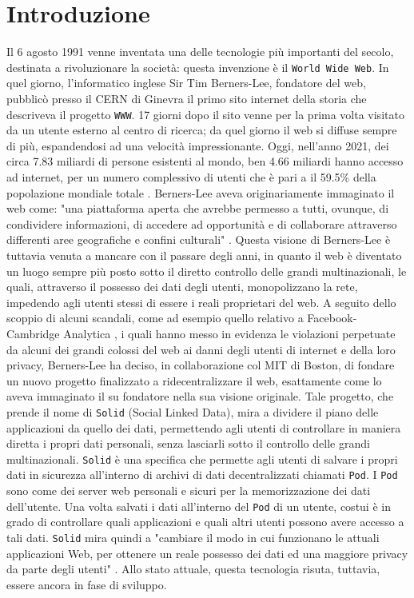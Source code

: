 \onehalfspacing

\chapter{Introduzione}

\medskip

Il 6 agosto 1991 venne inventata una delle tecnologie più importanti del secolo, destinata a rivoluzionare la società: questa invenzione è il {\tt World Wide Web}. In quel giorno, l'informatico inglese Sir Tim Berners-Lee, fondatore del web, pubblicò presso il CERN di Ginevra il primo sito internet della storia che descriveva il progetto {\tt WWW}. 17 giorni dopo il sito venne per la prima volta visitato da un utente esterno al centro di ricerca; da quel giorno il web si diffuse sempre di più, espandendosi ad una velocità impressionante. Oggi, nell'anno 2021, dei circa 7.83 miliardi di persone esistenti al mondo, ben 4.66 miliardi hanno accesso ad internet, per un numero complessivo di utenti che è pari a il 59.5\% della popolazione mondiale totale \cite{wearesocial}. Berners-Lee aveva originariamente immaginato il web come: "una piattaforma aperta che avrebbe permesso a tutti, ovunque, di condividere informazioni, di accedere ad opportunità e di collaborare attraverso differenti aree geografiche e confini culturali" \cite{worldwideweb}. Questa visione di Berners-Lee è tuttavia venuta a mancare con il passare degli anni, in quanto il web è diventato un luogo sempre più posto sotto il diretto controllo delle grandi multinazionali, le quali, attraverso il possesso dei dati degli utenti, monopolizzano la rete, impedendo agli utenti stessi di essere i reali proprietari del web. A seguito dello scoppio di alcuni scandali, come ad esempio quello relativo a Facebook-Cambridge Analytica \cite{facebook}, i quali hanno messo in evidenza le violazioni perpetuate da alcuni dei grandi colossi del web ai danni degli utenti di internet e della loro privacy, Berners-Lee ha deciso, in collaborazione col MIT di Boston, di fondare un nuovo progetto finalizzato a ridecentralizzare il web, esattamente come lo aveva immaginato il su fondatore nella sua visione originale. Tale progetto, che prende il nome di {\tt Solid} (Social Linked Data), mira a dividere il piano delle applicazioni da quello dei dati, permettendo agli utenti di controllare in maniera diretta i propri dati personali, senza lasciarli sotto il controllo delle grandi multinazionali. {\tt Solid} è una specifica che permette agli utenti di salvare i propri dati in sicurezza all'interno di archivi di dati decentralizzati chiamati {\tt Pod}. I {\tt Pod} sono come dei server web personali e sicuri per la memorizzazione dei dati dell'utente. Una volta salvati i dati all'interno del {\tt Pod} di un utente, costui è in grado di controllare quali applicazioni e quali altri utenti possono avere accesso a tali dati. {\tt Solid} mira quindi a "cambiare il modo in cui funzionano le attuali applicazioni Web, per ottenere un reale possesso dei dati ed una maggiore privacy da parte degli utenti" \cite{mitsolid}. Allo stato attuale, questa tecnologia risuta, tuttavia, essere ancora in fase di sviluppo.

